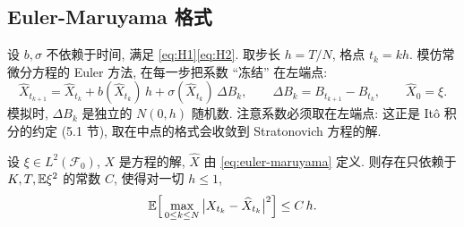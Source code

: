 \subsection{Euler-Maruyama 格式}

设 $b,\sigma$ 不依赖于时间, 满足 \eqref{eq:H1}\eqref{eq:H2}. 取步长 $h=T/N$, 格点 $t_k=kh$. 模仿常微分方程的 Euler 方法, 在每一步把系数 ``冻结'' 在左端点:
\begin{equation}\label{eq:euler-maruyama}
\widehat{X}_{t_{k+1}}=\widehat{X}_{t_k}+b(\widehat{X}_{t_k})\,h+\sigma(\widehat{X}_{t_k})\,\Delta B_k,\qquad\Delta B_k=B_{t_{k+1}}-B_{t_k},\qquad\widehat{X}_0=\xi.
\end{equation}
模拟时, $\Delta B_k$ 是独立的 $N(0,h)$ 随机数. 注意系数必须取在左端点: 这正是 It\^o 积分的约定 (5.1 节), 取在中点的格式会收敛到 Stratonovich 方程的解.

\begin{theorem}\label{thm:em}
设 $\xi\in L^2(\mathcal{F}_0)$, $X$ 是方程的解, $\widehat{X}$ 由 \eqref{eq:euler-maruyama} 定义. 则存在只依赖于 $K,T,\mathbb{E}\xi^2$ 的常数 $C$, 使得对一切 $h\le1$,
\[
\mathbb{E}\Big[\max_{0\le k\le N}\big\lvert X_{t_k}-\widehat{X}_{t_k}\big\rvert^2\Big]\le C\,h.
\]
\end{theorem}

